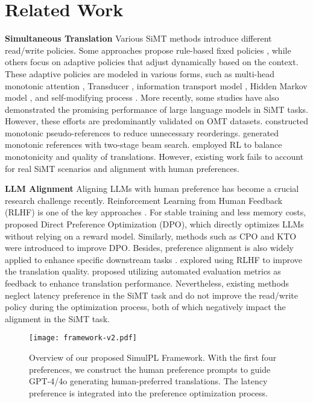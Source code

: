 \section{Related Work}
\noindent\textbf{Simultaneous Translation}
Various SiMT methods introduce different read/write policies. Some approaches propose rule-based fixed policies \citep{ma2019stacl,elbayad2020efficient}, while others focus on adaptive policies that adjust dynamically based on the context. These adaptive policies are modeled in various forms, such as multi-head monotonic attention \cite{mamonotonic}, Transducer \citep{liu2021cross}, information transport model \citep{zhang-feng-2022-information}, Hidden Markov model \citep{zhang2023hidden}, and self-modifying process \citep{yu-etal-2024-self}. More recently, some studies \citep{wang2023simultaneous,agostinelli-etal-2024-simul,wang2024conversational} have also demonstrated the promising performance of large language models in SiMT tasks. However, these efforts are predominantly validated on OMT datasets. \citet{chen2020improving} constructed monotonic pseudo-references to reduce unnecessary reorderings. \citet{wang2023better} generated monotonic references with two-stage beam search. \citet{guo2023simultaneous} employed RL to balance monotonicity and quality of translations. However, existing work fails to account for real SiMT scenarios and alignment with human preferences.

\noindent\textbf{LLM Alignment} Aligning LLMs with human preference has become a crucial research challenge recently. Reinforcement Learning from Human Feedback (RLHF) is one of the key approaches \citep{ouyang2022training,bai2022training,yuan2023rrhf}. For stable training and less memory costs, \citet{rafailov2024direct} proposed Direct Preference Optimization (DPO), which directly optimizes LLMs without relying on a reward model. Similarly, methods such as CPO \citep{xu2024contrastive} and KTO \citep{ethayarajh2024kto} were introduced to improve DPO. Besides, preference alignment is also widely applied to enhance specific downstream tasks \citep{stiennon2020learning}. \citet{xu2024advancing} explored using RLHF to improve the translation quality. \citet{he2024improving} proposed utilizing automated evaluation metrics as feedback to enhance translation performance. Nevertheless, existing methods neglect latency preference in the SiMT task and do not improve the read/write policy during the optimization process, both of which negatively impact the alignment in the SiMT task.

\begin{figure}[t]
	\centering
	\small
        \texttt{[image: framework-v2.pdf]}
        \vspace{-0.2in}
	\caption{Overview of our proposed SimulPL Framework. With the first four preferences, we construct the human preference prompts to guide GPT-4/4o generating human-preferred translations. The latency preference is integrated into the preference optimization process.}
 \vspace{-0.2in}
	\label{simulpl-framework}
    \end{figure}